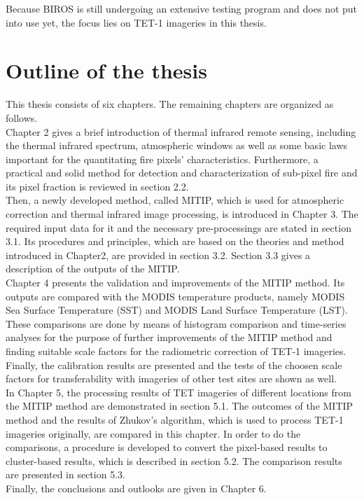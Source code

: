 \noindent Because BIROS is still undergoing an extensive testing program and does not put into use yet, the focus lies on TET-1 imageries in this thesis.\\ 


\section{Outline of the thesis}
This thesis consists of six chapters. The remaining chapters are organized as follows.\\

\noindent Chapter 2 gives a brief introduction of thermal infrared remote sensing, including the thermal infrared spectrum, atmospheric windows as well as some basic laws important for the quantitating fire pixels' characteristics. Furthermore, a practical and solid method for detection and characterization of sub-pixel fire and its pixel fraction is reviewed in section 2.2.\\

\noindent Then, a newly developed method, called MITIP, which is used for atmospheric correction and thermal infrared image processing, is introduced in Chapter 3. The required input data for it and the necessary pre-processings are stated in section 3.1. Its procedures and principles, which are based on the theories and method introduced in Chapter2, are provided in section 3.2. Section 3.3 gives a description of the outputs of the MITIP.\\

\noindent Chapter 4 presents the validation and improvements of the MITIP method. Its outputs are compared with the MODIS temperature products, namely MODIS Sea Surface Temperature (SST) and MODIS Land Surface Temperature (LST). These comparisons are done by means of histogram comparison and time-series analyses for the purpose of further improvements of the MITIP method and finding suitable scale factors for the radiometric correction of TET-1 imageries. Finally, the calibration results are presented and the tests of the choosen scale factors for transferability with imageries of other test sites are shown as well.\\

\noindent In Chapter 5, the processing results of TET imageries of different locations from the MITIP method are demonstrated in section 5.1. The outcomes of the MITIP method and the results of Zhukov's algorithm, which is used to process TET-1 imageries originally, are compared in this chapter. In order to do the comparisons, a procedure is developed to convert the pixel-based results to cluster-based results, which is described in section 5.2. The comparison results are presented in section 5.3.\\

\noindent Finally, the conclusions and outlooks are given in Chapter 6.\\
